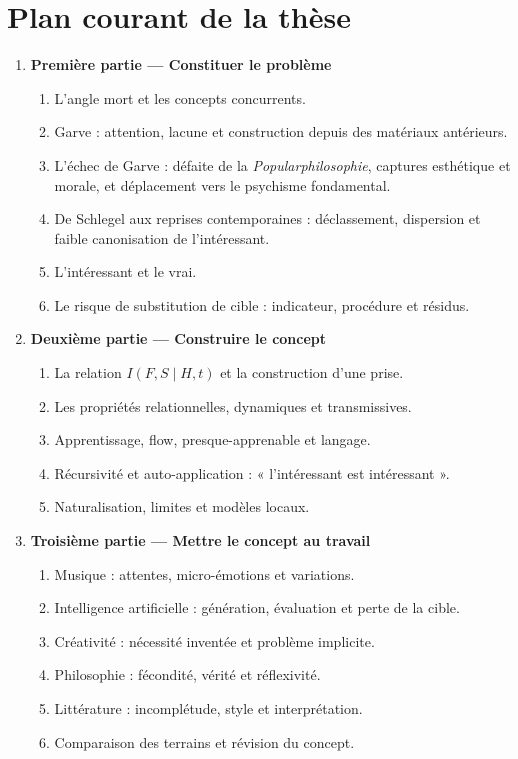 \documentclass[11pt,a4paper]{article}
\begin{document}
\section{Plan courant de la thèse}

\begin{enumerate}
  \item \textbf{Première partie --- Constituer le problème}
    \begin{enumerate}
      \item L'angle mort et les concepts concurrents.
      \item Garve : attention, lacune et construction depuis des matériaux
            antérieurs.
      \item L'échec de Garve : défaite de la \emph{Popularphilosophie}, captures
            esthétique et morale, et déplacement vers le psychisme fondamental.
      \item De Schlegel aux reprises contemporaines : déclassement, dispersion
            et faible canonisation de l'intéressant.
      \item L'intéressant et le vrai.
      \item Le risque de substitution de cible : indicateur, procédure et résidus.
    \end{enumerate}
  \item \textbf{Deuxième partie --- Construire le concept}
    \begin{enumerate}
      \item La relation \(I(F,S\mid H,t)\) et la construction d'une prise.
      \item Les propriétés relationnelles, dynamiques et transmissives.
      \item Apprentissage, flow, presque-apprenable et langage.
      \item Récursivité et auto-application : « l'intéressant est intéressant ».
      \item Naturalisation, limites et modèles locaux.
    \end{enumerate}
  \item \textbf{Troisième partie --- Mettre le concept au travail}
    \begin{enumerate}
      \item Musique : attentes, micro-émotions et variations.
      \item Intelligence artificielle : génération, évaluation et perte de la
            cible.
      \item Créativité : nécessité inventée et problème implicite.
      \item Philosophie : fécondité, vérité et réflexivité.
      \item Littérature : incomplétude, style et interprétation.
      \item Comparaison des terrains et révision du concept.
    \end{enumerate}
\end{enumerate}
\end{document}
